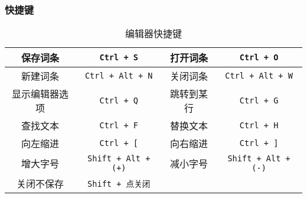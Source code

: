 \subsubsection{快捷键}

\begin{table}[ht]
\centering
\caption{编辑器快捷键}\label{editor_tab1}
\begin{tabular}{|c|c|c|c|}
\hline
保存词条 & \lstinline|Ctrl + S| & 打开词条 & \lstinline|Ctrl + O| \\
\hline
新建词条 & \lstinline|Ctrl + Alt + N| & 关闭词条 & \lstinline|Ctrl + Alt + W| \\
\hline
显示编辑器选项 & \lstinline|Ctrl + Q| & 跳转到某行 & \lstinline|Ctrl + G| \\
\hline
查找文本 & \lstinline|Ctrl + F| & 替换文本 & \lstinline|Ctrl + H| \\
\hline
向左缩进 & \lstinline|Ctrl + [| & 向右缩进 & \lstinline|Ctrl + ]| \\
\hline
增大字号 & \lstinline|Shift + Alt + (+)| & 减小字号 & \lstinline|Shift + Alt + (-)| \\
\hline
关闭不保存 & \lstinline|Shift + 点关闭| &  &  \\
\hline
\end{tabular}
\end{table}
